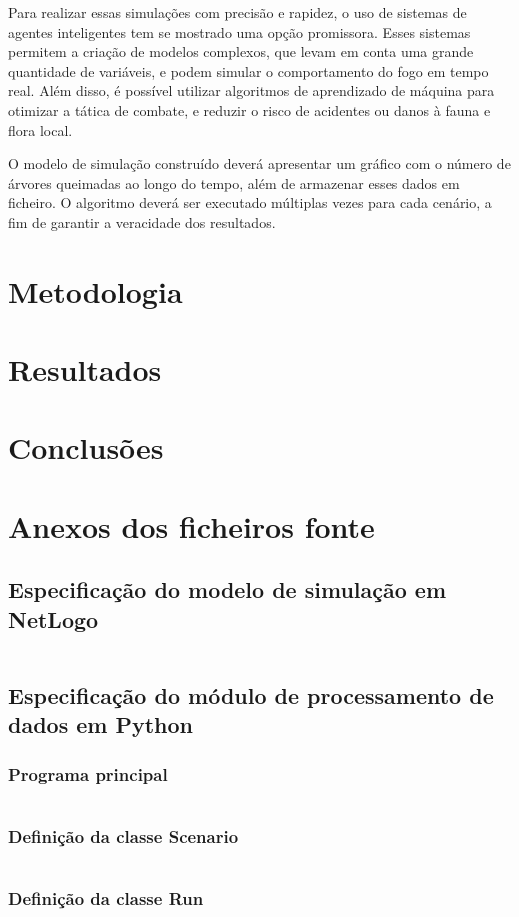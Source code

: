 \documentclass[a4paper, portuguese]{report}
\begin{document}
Para realizar essas simulações com precisão e rapidez, o uso de sistemas de agentes inteligentes tem se mostrado uma opção promissora. Esses sistemas permitem a criação de modelos complexos, que levam em conta uma grande quantidade de variáveis, e podem simular o comportamento do fogo em tempo real. Além disso, é possível utilizar algoritmos de aprendizado de máquina para otimizar a tática de combate, e reduzir o risco de acidentes ou danos à fauna e flora local.

O modelo de simulação construído deverá apresentar um gráfico com o número de árvores queimadas ao longo do tempo, além de armazenar esses dados em ficheiro. O algoritmo deverá ser executado múltiplas vezes para cada cenário, a fim de garantir a veracidade  dos resultados.

\chapter{Metodologia}\label{chapter:methodology}


\chapter{Resultados}\label{chapter:results}


\chapter{Conclusões}


\appendix
\chapter{Anexos dos ficheiros fonte}\label{chapter:appendix}
\section{Especificação do modelo de simulação em NetLogo}\label{sec:model_spec}
\inputminted{nl-lexer.py:NetLogoLexer -x}{../src/forest_fire.nlogo}

\section{Especificação do módulo de processamento de dados em Python}\label{sec:data_proc}
\subsection{Programa principal}
\inputminted{python}{../src/main.py}

\subsection{Definição da classe Scenario}
\inputminted{python}{../src/forestfire/scenario.py}

\subsection{Definição da classe Run}
\inputminted{python}{../src/forestfire/run.py}



\end{document}

